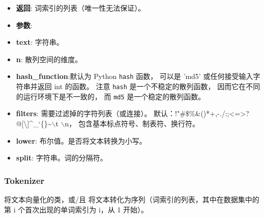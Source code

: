 \begin{itemize}
\item
  \textbf{返回}: 词索引的列表（唯一性无法保证）。
\item
  \textbf{参数}:
\item
  \textbf{text}: 字符串。
\item
  \textbf{n}: 散列空间的维度。
\item
  \textbf{hash\_function}:默认为 Python \texttt{hash} 函数， 可以是
  'md5' 或任何接受输入字符串并返回 int 的函数。 注意 \texttt{hash}
  是一个不稳定的散列函数， 因而它在不同的运行环境下是不一致的， 而
  \texttt{md5} 是一个稳定的散列函数。
\item
  \textbf{filters}: 需要过滤掉的字符列表（或连接）。
  默认：!"\#\$\%\&()*+,-./:;\textless{}=\textgreater{}?@{[}\textbackslash{}{]}\^{}\_`\{\textbar{}\}\textasciitilde{}$\backslash$t $\backslash$n，
  包含基本标点符号、制表符、换行符。
\item
  \textbf{lower}: 布尔值。是否将文本转换为小写。
\item
  \textbf{split}: 字符串。词的分隔符。
\end{itemize}

\subsubsection{Tokenizer}\label{tokenizer}

\begin{Shaded}
\begin{Highlighting}[]
\OperatorTok{=}\NormalTok{,}
                                   \OperatorTok{=}\StringTok{'!"#$\%\&()*+,-./:;<=>?@[}\CharTok{\textbackslash{}\textbackslash{}}\StringTok{]^_`\{|\}~}\NormalTok{,}
                                   \OperatorTok{=}\NormalTok{,}
                                   \OperatorTok{=}\NormalTok{,}\OperatorTok{=}\NormalTok{)}
\end{Highlighting}
\end{Shaded}

将文本向量化的类，或/且
将文本转化为序列（词索引的列表，其中在数据集中的第 i
个首次出现的单词索引为 i，从 1 开始）。

